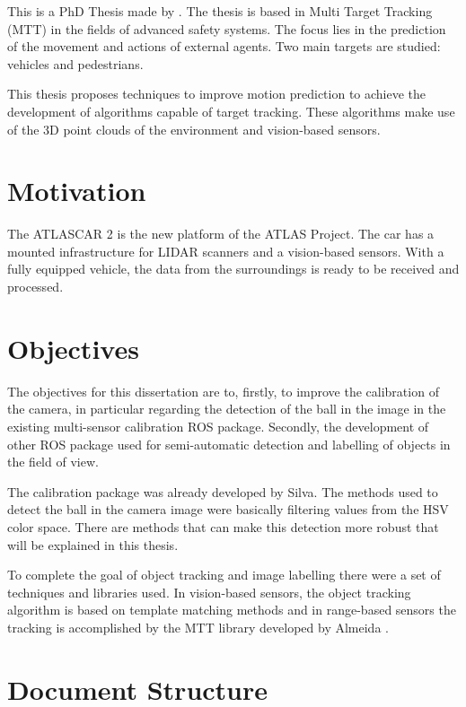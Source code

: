 This is a PhD Thesis made by \cite{SoaresDeAlmeida2016a}. The thesis is based in Multi Target Tracking (MTT) in the fields of advanced safety systems. The focus lies in the prediction of the movement and actions of external agents. Two main targets are studied: vehicles and pedestrians. 

This thesis proposes techniques to improve motion prediction to achieve the development of algorithms capable of target tracking. These algorithms make use of the 3D point clouds of the environment and vision-based sensors. 


\section{Motivation}
The ATLASCAR 2 is the new platform of the ATLAS Project. The car has a mounted infrastructure for LIDAR scanners and a vision-based sensors. With a fully equipped vehicle, the data from the surroundings is ready to be received and processed.

\section{Objectives}
The objectives for this dissertation are to, firstly, to improve the calibration of the camera, in particular regarding the detection of the ball in the image in the existing multi-sensor calibration ROS package. Secondly, the development of other ROS package used for semi-automatic detection and labelling of objects in the field of view.

The calibration package was already developed by Silva\cite{VieiradaSilva2016}. The methods used to detect the ball in the camera image were basically filtering  values from the HSV color space. There are methods that can make this detection more robust that will be explained in this thesis. 

To complete the goal of object tracking and image labelling there were a set of techniques and libraries used. In vision-based sensors, the object tracking algorithm is based on template matching methods and in range-based sensors the tracking is accomplished by the MTT library developed by Almeida \cite{SoaresDeAlmeida2016a}.

\section{Document Structure}

